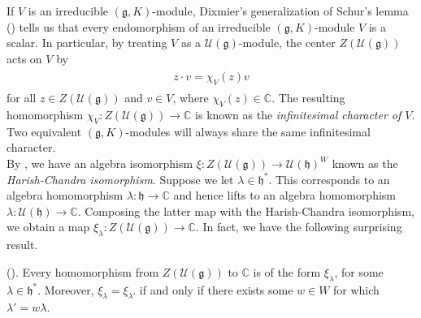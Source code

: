 \noindent If $V$ is an irreducible $(\mathfrak{g}, K)$-module, Dixmier's generalization of Schur's lemma (\cite[Proposition 5.19]{Kna13}) tells us that every endomorphism of an irreducible $(\mathfrak{g}, K)$-module $V$ is a scalar. In particular, by treating $V$ as a $\mathcal{U}(\mathfrak{g})$-module, the center $Z(\mathcal{U}(\mathfrak{g}))$ acts on $V$ by
\begin{align*}
\begin{split}
z \cdot v = \chi_V(z)v
\end{split}
\end{align*}
\noindent for all $z \in Z(\mathcal{U}(\mathfrak{g}))$ and $v \in V$, where $\chi_V(z)\in\mathbb{C}$. The resulting homomorphism $\chi_V : Z(\mathcal{U}(\mathfrak{g})) \to \mathbb{C}$ is known as the {\em infinitesimal character of $V$}. Two equivalent $(\mathfrak{g}, K)$-modules will always share the same infinitesimal character.\\

\noindent By \cite[Theorem 0.2.8]{Vog81}, we have an algebra isomorphism $\xi : Z(\mathcal{U}(\mathfrak{g})) \to \mathcal{U}(\mathfrak{h})^W$ known as the {\em Harish-Chandra isomorphism}. Suppose we let $\lambda \in \mathfrak{h}^*$. This corresponds to an algebra homomorphism $\lambda : \mathfrak{h} \to \mathbb{C}$ and hence lifts to an algebra homomorphism $\lambda : \mathcal{U}(\mathfrak{h}) \to \mathbb{C}$. Composing the latter map with the Harish-Chandra isomorphism, we obtain a map $\xi_\lambda : Z(\mathcal{U}(\mathfrak{g})) \to \mathbb{C}$. In fact, we have the following surprising result.\\
\noindent\begin{theorem}\textup{(\cite[Corollary 0.2.10]{Vog81}).} Every homomorphism from $Z(\mathcal{U}(\mathfrak{g}))$ to $\mathbb{C}$ is of the form $\xi_\lambda$, for some $\lambda \in \mathfrak{h}^*$. Moreover, $\xi_\lambda = \xi_{\lambda'}$ if and only if there exists some $w \in W$ for which $\lambda' = w\lambda$.\\
\end{theorem}

